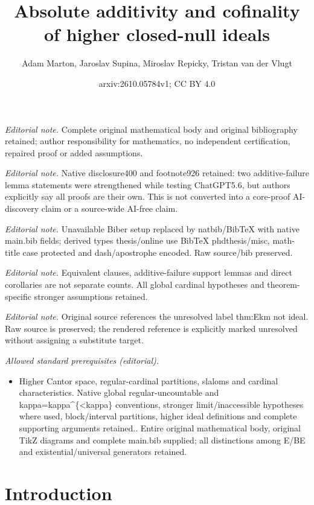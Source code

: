 \documentclass[10pt,a4paper]{amsart}
\title{Absolute additivity and cofinality of higher closed-null ideals}
\author{Adam Marton, Jaroslav Supina, Miroslav Repicky, Tristan van der Vlugt}
\date{arxiv:2610.05784v1; CC BY 4.0}
\theoremstyle{definition}
\begin{document}
\maketitle
\noindent\textit{Editorial note.} Complete original mathematical body and original bibliography retained; author responsibility for mathematics, no independent certification, repaired proof or added assumptions.\par\medskip
\noindent\textit{Editorial note.} Native disclosure400 and footnote926 retained: two additive-failure lemma statements were strengthened while testing ChatGPT5.6, but authors explicitly say all proofs are their own. This is not converted into a core-proof AI-discovery claim or a source-wide AI-free claim.\par\medskip
\noindent\textit{Editorial note.} Unavailable Biber setup replaced by natbib/BibTeX with native main.bib fields; derived types thesis/online use BibTeX phdthesis/misc, math-title case protected and dash/apostrophe encoded. Raw source/bib preserved.\par\medskip
\noindent\textit{Editorial note.} Equivalent clauses, additive-failure support lemmas and direct corollaries are not separate counts. All global cardinal hypotheses and theorem-specific stronger assumptions retained.\par\medskip
\noindent\textit{Editorial note.} Original source references the unresolved label thm:Ekm not ideal. Raw source is preserved; the rendered reference is explicitly marked unresolved without assigning a substitute target.\par\medskip
\noindent\textit{Allowed standard prerequisites (editorial).}\begin{itemize}
\item Higher Cantor space, regular-cardinal partitions, slaloms and cardinal characteristics. Native global regular-uncountable and kappa=kappa\textasciicircum{}\{<kappa\} conventions, stronger limit/inaccessible hypotheses where used, block/interval partitions, higher ideal definitions and complete supporting arguments retained.. Entire original mathematical body, original TikZ diagrams and complete main.bib supplied; all distinctions among E/BE and existential/universal generators retained.
\end{itemize}\medskip
	\section{Introduction}\label{sec:introduction}
	
\end{document}
